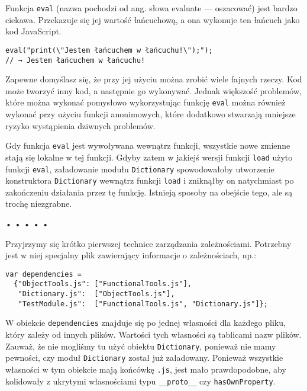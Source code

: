   
Funkcja \texttt{eval} (nazwa pochodzi od ang. słowa evaluate — oszacować) jest bardzo ciekawa. Przekazuje się jej wartość łańcuchową, a ona wykonuje ten łańcuch jako kod JavaScript.

  
\begin{verbatim} 
eval("print(\"Jestem łańcuchem w łańcuchu!\");");
// → Jestem łańcuchem w łańcuchu!
\end{verbatim}
  
Zapewne domyślasz się, że przy jej użyciu można zrobić wiele fajnych rzeczy. Kod może tworzyć inny kod, a następnie go wykonywać. Jednak większość problemów, które można wykonać pomysłowo wykorzystując funkcję \texttt{eval} można również wykonać przy użyciu funkcji anonimowych, które dodatkowo stwarzają mniejsze ryzyko wystąpienia dziwnych problemów.

  
Gdy funkcja \texttt{eval} jest wywoływana wewnątrz funkcji, wszystkie nowe zmienne stają się lokalne w tej funkcji. Gdyby zatem w jakiejś wersji funkcji \texttt{load} użyto funkcji \texttt{eval}, załadowanie modułu \texttt{Dictionary} spowodowałoby utworzenie konstruktora \texttt{Dictionary} wewnątrz funkcji \texttt{load} i zniknąłby on natychmiast po zakończeniu działania przez tę funkcję. Istnieją sposoby na obejście tego, ale są trochę niezgrabne.



\begin{center}
• • • • •
\end{center}

  
Przyjrzymy się krótko pierwszej technice zarządzania zależnościami. Potrzebny jest w niej specjalny plik zawierający informacje o zależnościach, np.:

  
\begin{verbatim} 
var dependencies =
  {"ObjectTools.js": ["FunctionalTools.js"],
   "Dictionary.js":  ["ObjectTools.js"],
   "TestModule.js":  ["FunctionalTools.js", "Dictionary.js"]};
 \end{verbatim}
  
W obiekcie \texttt{dependencies} znajduje się po jednej własności dla każdego pliku, który zależy od innych plików. Wartości tych własności są tablicami nazw plików. Zauważ, że nie mogliśmy tu użyć obiektu \texttt{Dictionary}, ponieważ nie mamy pewności, czy moduł \texttt{Dictionary} został już załadowany. Ponieważ wszystkie własności w tym obiekcie mają końcówkę \texttt{.js}, jest mało prawdopodobne, aby kolidowały z ukrytymi własnościami typu \texttt{\_\_proto\_\_} czy \texttt{hasOwnProperty}.

